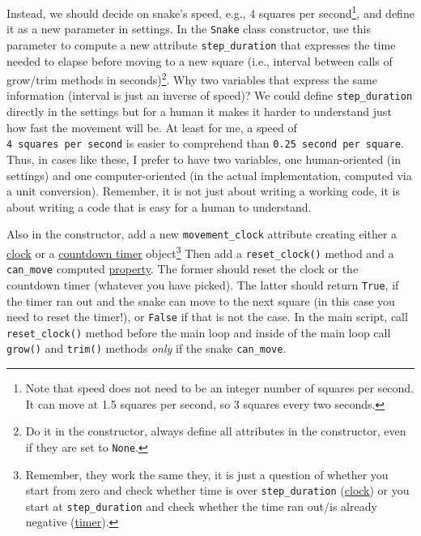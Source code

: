 \documentclass[
]{book}
\begin{document}
Instead, we should decide on snake's speed, e.g., 4 squares per second\footnote{Note that speed does not need to be an integer number of squares per second. It can move at 1.5 squares per second, so 3 squares every two seconds.}, and define it as a new parameter in settings. In the \texttt{Snake} class constructor, use this parameter to compute a new attribute \texttt{step\_duration} that expresses the time needed to elapse before moving to a new square (i.e., interval between calls of grow/trim methods in seconds)\footnote{Do it in the constructor, always define all attributes in the constructor, even if they are set to \texttt{None}.}. Why two variables that express the same information (interval is just an inverse of speed)? We could define \texttt{step\_duration} directly in the settings but for a human it makes it harder to understand just how fast the movement will be. At least for me, a speed of \texttt{4\ squares\ per\ second} is easier to comprehend than \texttt{0.25\ second\ per\ square}. Thus, in cases like these, I prefer to have two variables, one human-oriented (in settings) and one computer-oriented (in the actual implementation, computed via a unit conversion). Remember, it is not just about writing a working code, it is about writing a code that is easy for a human to understand.

Also in the constructor, add a new \texttt{movement\_clock} attribute creating either a \href{https://www.psychopy.org/api/clock.html\#psychopy.clock.Clock}{clock} or a \href{https://www.psychopy.org/api/clock.html\#psychopy.clock.CountdownTimer}{countdown timer} object\footnote{Remember, they work the same they, it is just a question of whether you start from zero and check whether time is over \texttt{step\_duration} (\href{https://www.psychopy.org/api/clock.html\#psychopy.clock.Clock}{clock}) or you start at \texttt{step\_duration} and check whether the time ran out/is already negative (\href{https://www.psychopy.org/api/clock.html\#psychopy.clock.CountdownTimer}{timer}).} Then add a \texttt{reset\_clock()} method and a \texttt{can\_move} computed \protect\hyperlink{computed-attribute-property}{property}. The former should reset the clock or the countdown timer (whatever you have picked). The latter should return \texttt{True}, if the timer ran out and the snake can move to the next square (in this case you need to reset the timer!), or \texttt{False} if that is not the case. In the main script, call \texttt{reset\_clock()} method before the main loop and inside of the main loop call \texttt{grow()} and \texttt{trim()} methods \emph{only} if the snake \texttt{can\_move}.
\end{document}
